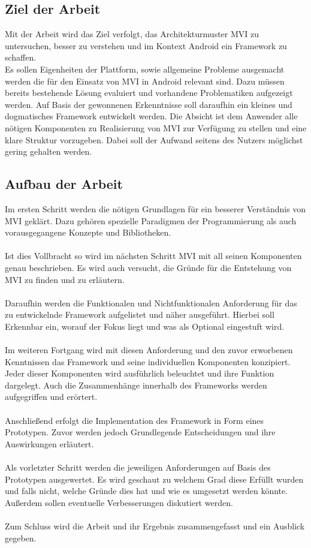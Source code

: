 \subsection{Ziel der Arbeit}
\label{subsec:ziel-der-arbeit}
Mit der Arbeit wird das Ziel verfolgt, das Architekturmuster MVI zu untersuchen, besser zu verstehen und im Kontext Android ein Framework zu schaffen.
\\
Es sollen Eigenheiten der Plattform, sowie allgemeine Probleme ausgemacht werden die für den Einsatz von MVI in Android relevant sind. Dazu müssen bereits bestehende Lösung evaluiert und vorhandene Problematiken aufgezeigt werden. Auf Basis der gewonnenen Erkenntnisse soll daraufhin ein kleines und dogmatisches Framework entwickelt werden. Die Absicht ist dem Anwender alle nötigen Komponenten zu Realisierung von MVI zur Verfügung zu stellen und eine klare Struktur vorzugeben. Dabei soll der Aufwand seitens des Nutzers möglichst gering gehalten werden.

\subsection{Aufbau der Arbeit}
\label{subsec:aufbau-der-arbeit}
Im ersten Schritt werden die nötigen Grundlagen für ein besserer Verständnis von MVI geklärt. Dazu gehören spezielle Paradigmen der Programmierung als auch vorausgegangene Konzepte und Bibliotheken.
\\\\
Ist dies Vollbracht so wird im nächsten Schritt MVI mit all seinen Komponenten genau beschrieben. Es wird auch versucht, die Gründe für die Entstehung von MVI zu finden und zu erläutern.
\\\\
Daraufhin werden die Funktionalen und Nichtfunktionalen Anforderung für das zu entwickelnde Framework aufgelistet und näher ausgeführt. Hierbei soll Erkennbar ein, worauf der Fokus liegt und was als Optional eingestuft wird. 
\\\\
Im weiteren Fortgang wird mit diesen Anforderung und den zuvor erworbenen Kenntnissen das Framework und seine individuellen Komponenten konzipiert. Jeder dieser Komponenten wird ausführlich beleuchtet und ihre Funktion dargelegt. Auch die Zusammenhänge innerhalb des Frameworks werden aufgegriffen und erörtert.
\\\\
Anschließend erfolgt die Implementation des Framework in Form eines Prototypen. Zuvor werden jedoch Grundlegende Entscheidungen und ihre Auswirkungen erläutert. 
\\\\
Als vorletzter Schritt werden die jeweiligen Anforderungen auf Basis des Prototypen ausgewertet. Es wird geschaut zu welchem Grad diese Erfüllt wurden und falls nicht, welche Gründe dies hat und wie es umgesetzt werden könnte. Außerdem sollen eventuelle Verbesserungen diskutiert werden.
\\\\
Zum Schluss wird die Arbeit und ihr Ergebnis zusammengefasst und ein Ausblick gegeben.